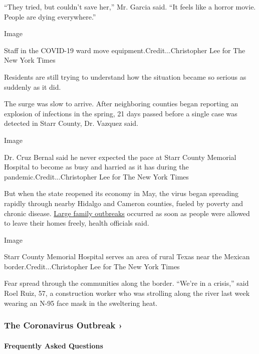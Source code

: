 ``They tried, but couldn't save her,'' Mr. Garcia said. ``It feels like
a horror movie. People are dying everywhere.''

Image

Staff in the COVID-19 ward move equipment.Credit...Christopher Lee for
The New York Times

Residents are still trying to understand how the situation became so
serious as suddenly as it did.

The surge was slow to arrive. After neighboring counties began reporting
an explosion of infections in the spring, 21 days passed before a single
case was detected in Starr County, Dr. Vazquez said.

Image

Dr. Cruz Bernal said he never expected the pace at Starr County Memorial
Hospital to become as busy and harried as it has during the
pandemic.Credit...Christopher Lee for The New York Times

But when the state reopened its economy in May, the virus began
spreading rapidly through nearby Hidalgo and Cameron counties, fueled by
poverty and chronic disease.
\href{https://www.nytimes3xbfgragh.onion/2020/07/14/us/coronavirus-texas-rio-grande-valley-border.html}{Large
family outbreaks} occurred as soon as people were allowed to leave their
homes freely, health officials said.

Image

Starr County Memorial Hospital serves an area of rural Texas near the
Mexican border.Credit...Christopher Lee for The New York Times

Fear spread through the communities along the border. ``We're in a
crisis,'' said Roel Ruiz, 57, a construction worker who was strolling
along the river last week wearing an N-95 face mask in the sweltering
heat.

\href{https://www.nytimes3xbfgragh.onion/news-event/coronavirus?action=click\&pgtype=Article\&state=default\&region=MAIN_CONTENT_3\&context=storylines_faq}{}

\hypertarget{the-coronavirus-outbreak-}{%
\subsubsection{The Coronavirus Outbreak
›}\label{the-coronavirus-outbreak-}}

\hypertarget{frequently-asked-questions}{%
\paragraph{Frequently Asked
Questions}\label{frequently-asked-questions}}

